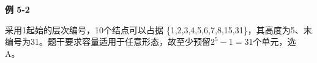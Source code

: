 {\color{ink}\bfseries 例 5-2}\par\vspace{1bp}采用1起始的层次编号，10个结点可以占据 \{1,\allowbreak{}2,\allowbreak{}3,\allowbreak{}4,\allowbreak{}5,\allowbreak{}6,\allowbreak{}7,\allowbreak{}8,\allowbreak{}15,\allowbreak{}31\}，其高度为5、末编号为31。题干要求容量适用于任意形态，故至少预留\(2^{5}-1=\allowbreak{}31\)个单元，选 A。
